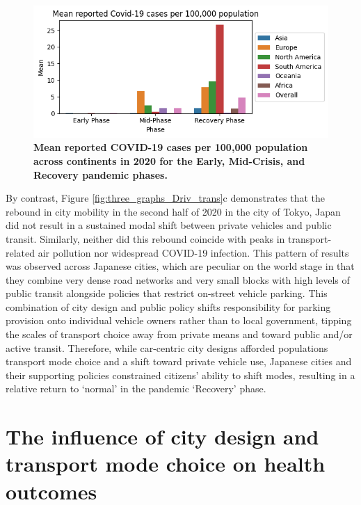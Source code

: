 \documentclass[preprint,10pt]{elsarticle} %
\begin{document}
\begin{figure}
\centering

\includegraphics[trim={0 0 0 0},clip,scale=0.8]{Images/covidCases7Ave_plot.png}
\caption{\bf Mean reported COVID-19 cases per 100,000 population across  continents in 2020 for the Early, Mid-Crisis, and Recovery pandemic phases.}  
 \label{fig:covidCases7Ave}
\end{figure}

By contrast, Figure \ref{fig:three_graphs_Driv_trans}c demonstrates that the rebound in city mobility in the second half of 2020 in the city of Tokyo, Japan did not result in a sustained modal shift between private vehicles and public transit. Similarly, neither did this rebound coincide with peaks in transport-related air pollution nor widespread COVID-19 infection. This pattern of results was observed across Japanese cities, which are peculiar on the world stage in that they combine very dense road networks and very small blocks with high levels of public transit alongside policies that restrict on-street vehicle parking\cite{clements2019socialising}. This combination of city design and public policy shifts responsibility for parking provision onto individual vehicle owners rather than to local government, tipping the scales of transport choice away from private means and toward public and/or active transit. Therefore, while car-centric city designs afforded populations transport mode choice and a shift toward private vehicle use, Japanese cities and their supporting policies constrained citizens' ability to shift modes, resulting in a relative return to `normal' in the pandemic `Recovery' phase.


\section*{\textcolor{OliveGreen}{The influence of city design and transport mode choice on health outcomes}}
\end{document}
